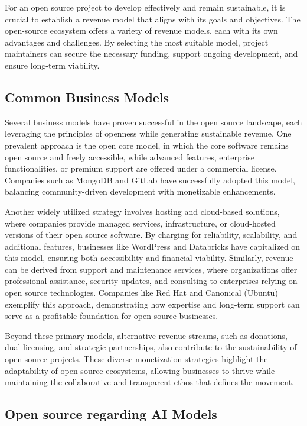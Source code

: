 For an open source project to develop effectively and remain sustainable, it is crucial to establish a revenue model that aligns with its goals and objectives. The open-source ecosystem offers a variety of revenue models, each with its own advantages and challenges. By selecting the most suitable model, project maintainers can secure the necessary funding, support ongoing development, and ensure long-term viability.

\subsection{Common Business Models}
Several business models have proven successful in the open source landscape, each leveraging the principles of openness while generating sustainable revenue. One prevalent approach is the open core model, in which the core software remains open source and freely accessible, while advanced features, enterprise functionalities, or premium support are offered under a commercial license. Companies such as MongoDB and GitLab have successfully adopted this model, balancing community-driven development with monetizable enhancements.  

Another widely utilized strategy involves hosting and cloud-based solutions, where companies provide managed services, infrastructure, or cloud-hosted versions of their open source software. By charging for reliability, scalability, and additional features, businesses like WordPress and Databricks have capitalized on this model, ensuring both accessibility and financial viability. Similarly, revenue can be derived from support and maintenance services, where organizations offer professional assistance, security updates, and consulting to enterprises relying on open source technologies. Companies like Red Hat and Canonical (Ubuntu) exemplify this approach, demonstrating how expertise and long-term support can serve as a profitable foundation for open source businesses.  

Beyond these primary models, alternative revenue streams, such as donations, dual licensing, and strategic partnerships, also contribute to the sustainability of open source projects. These diverse monetization strategies highlight the adaptability of open source ecosystems, allowing businesses to thrive while maintaining the collaborative and transparent ethos that defines the movement.

\subsection{Open source regarding AI Models}
\label{sec:Open_source_AI_Models}

